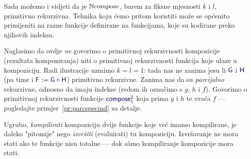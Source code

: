 
Sada možemo i vidjeti da je ${\mathbb N} compose$, barem za fiksne mjesnosti $k$ i $l$, primitivno rekurzivna. Tehnika koju ćemo pritom koristiti može se općenito primijeniti na razne funkcije definirane na funkcijama, koje su kodirane preko njihovih indeksa.

Naglasimo da ovdje \emph{ne} govorimo o primitivnoj rekurzivnosti kompozicije (rezultata komponiranja) niti o primitivnoj rekurzivnosti funkcija koje ulaze u kompoziciju. Radi ilustracije uzmimo $k=l=1$: tada nas ne zanima jesu li $\f G$ i $\f H$ (pa time i $\f F:=\f G\circ\f H$) primitivno rekurzivne. Zanima nas da su \emph{parcijalno} rekurzivne, odnosno da imaju indekse (redom ih označimo s $g$, $h$ i $f$). Govorimo o primitivnoj rekurzivnosti funkcije $\f{compose}_1^2$ koja prima $g$ i $h$ te vraća $f$ --- pogledajte primjer~\ref{pr:parcspecind} za detalje.

Ugrubo, \emph{kompilirati} kompoziciju dvije funkcije koje već imamo kompilirane, je daleko "pitomije" nego \emph{izvršiti} (evaluirati) tu kompoziciju. Izvršavanje ne mora stati ako te funkcije nisu totalne --- dok sâmo kompiliranje kompozicije mora stati.

